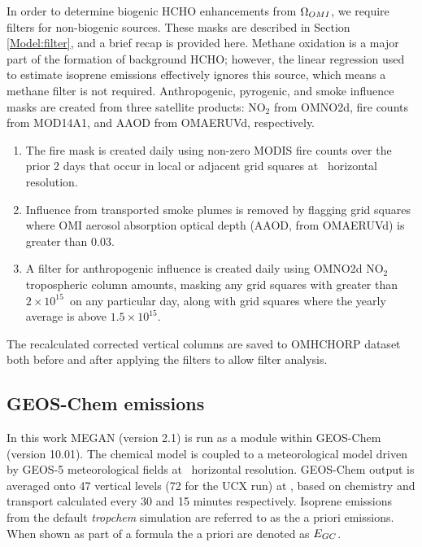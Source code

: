     In order to determine biogenic HCHO enhancements from $\Omega_{OMI}$, we require filters for non-biogenic sources.
    These masks are described in Section \ref{Model:filter}, and a brief recap is provided here.
    Methane oxidation is a major part of the formation of background HCHO; however, the linear regression used to estimate isoprene emissions effectively ignores this source, which means a methane filter is not required.
    Anthropogenic, pyrogenic, and smoke influence masks are created from three satellite products: NO$_2$ from OMNO2d, fire counts from MOD14A1, and AAOD from OMAERUVd, respectively.
    \begin{enumerate}
      \item 
      The fire mask is created daily using non-zero MODIS fire counts over the prior 2 days that occur in local or adjacent grid squares at \highhr ~horizontal resolution.
      \item 
      Influence from transported smoke plumes is removed by flagging grid squares where OMI aerosol absorption optical depth (AAOD, from OMAERUVd) is greater than 0.03.
      \item 
      A filter for anthropogenic influence is created daily using OMNO2d NO$_2$ tropospheric column amounts, masking any grid squares with greater than $2\times 10^{15}$\moleccm ~on any particular day, along with grid squares where the yearly average is above $1.5 \times 10^{15}$\moleccm.
    \end{enumerate}
    The recalculated corrected vertical columns are saved to OMHCHORP dataset both before and after applying the filters to allow filter analysis.
    
    
  \subsection{GEOS-Chem emissions}
    
    In this work MEGAN (version 2.1) is run as a module within GEOS-Chem (version 10.01).
    The chemical model is coupled to a meteorological model driven by GEOS-5 meteorological fields at \highhr ~horizontal resolution.
    GEOS-Chem output is averaged onto 47 vertical levels (72 for the UCX run) at \lowhr, based on chemistry and transport calculated every 30 and 15 minutes respectively.
    Isoprene emissions from the default \textit{tropchem} simulation are referred to as the a priori emissions.
    When shown as part of a formula the a priori are denoted as $E_{GC}$.
    
